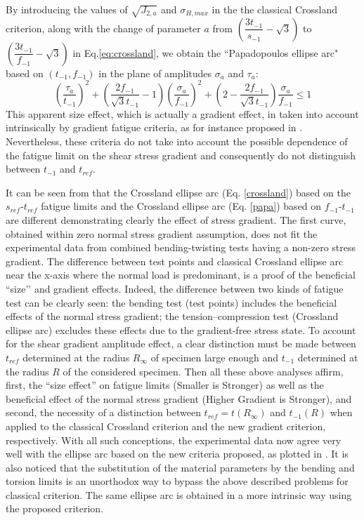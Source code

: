 By introducing the values of $\sqrt{J_{2,a}}$ and $\sigma_{H,max}$ in the the classical Crossland criterion, along with the change of parameter $a$  from $\left(\dfrac{3 t_{-1}}{s_{-1}}-\sqrt{3}\right)$ to $\left(\dfrac{3 t_{-1}}{f_{-1}}-\sqrt{3}\right)$ in Eq.\eqref{eq:crossland}, we obtain the ``Papadopoulos ellipse arc" based on $\left(t_{-1},f_{-1} \right) $ in the plane of amplitudes $\sigma_a$ and $\tau_a$:
\begin{equation}
	\left(\dfrac{\tau_a}{t_{-1}}\right)^2+\left(\dfrac{2f_{-1}}{\sqrt{3}t_{-1}}-1\right)\left(\dfrac{\sigma_a}{f_{-1}}\right)^2+\left(2-\dfrac{2f_{-1}}{\sqrt{3}t_{-1}}\right)\dfrac{\sigma_a}{f_{-1}}\leqslant 1
	\label{papa}
\end{equation}
This apparent size effect, which is actually a gradient effect, in taken
into account intrinsically by gradient fatigue criteria, as for instance
proposed in \cite{Papadopoulos1996513}. Nevertheless, these criteria do not take into account the possible dependence of the fatigue limit on the shear
stress gradient and consequently do not distinguish between $t_{-1}$
and $t_{ref}$.

It can be seen from  that the Crossland ellipse arc (Eq. \ref{crossland}) based on the $s_{ref}$-$ t_{ref}$ fatigue limits and the Crossland ellipse arc (Eq. \ref{papa}) based on $f_{-1}$-$t_{-1}$ are different demonstrating clearly the effect of stress gradient. The first curve, obtained within zero normal stress gradient assumption, does not fit the experimental data from combined bending-twisting tests having a non-zero stress gradient.  The difference between test points and classical Crossland ellipse arc near the x-axis where the normal load is predominant, is a proof of the beneficial ``size’’ and gradient effects. Indeed, the difference between two kinds of fatigue test can be clearly seen: the bending test (test points) includes the beneficial effects of the normal stress gradient; the tension–compression test (Crossland ellipse arc) excludes these effects due to the gradient-free stress state.  To account for the shear gradient amplitude effect, a clear distinction must be made between $t_{ref}$
determined at the radius $R_{\infty}$ of specimen large enough and $t_{-1}$ determined at the radius $R$ of the considered specimen.
Then all
these above analyses affirm, first, the ``size effect'' on fatigue limits
(Smaller is Stronger) as well as the beneficial effect of the normal
stress gradient (Higher Gradient is Stronger), and second, the
necessity of a distinction between $t_{ref}=t(R_{\infty})$ and $t_{-1}(R)$ when applied to the classical Crossland criterion and the new gradient criterion, respectively. With all such conceptions, the experimental data now agree very well with the ellipse arc based on  the new criteria proposed, as plotted in . It is also noticed that the substitution of the material parameters by the bending and torsion limits is an unorthodox way to bypass the above described problems for classical criterion. The same ellipse arc is obtained in a more intrinsic way using the proposed criterion.

